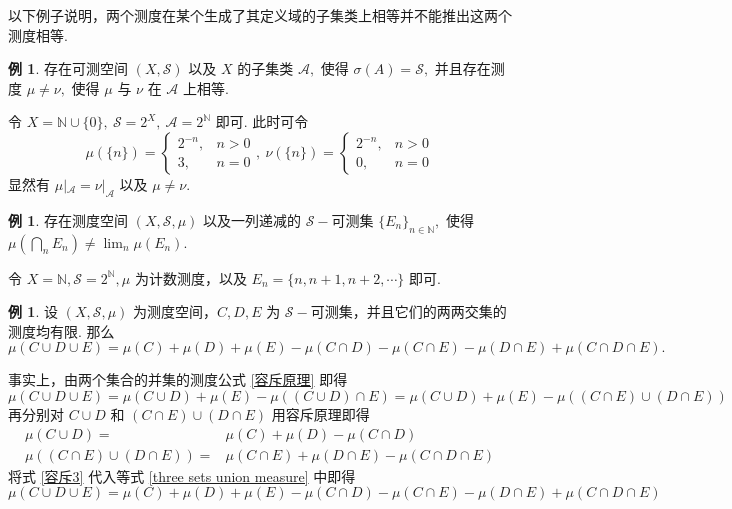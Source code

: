 \documentclass[12pt, a4paper, oneside]{book}
\numberwithin{figure}{section}
\theoremstyle{definition}
\newtheorem{example}[theorem]{例}
\begin{document}
以下例子说明，两个测度在某个生成了其定义域的子集类上相等并不能推出这两个测度相等.
\begin{example}
    存在可测空间 $(X,\mathcal S)$ 以及 $X$ 的子集类 $\mathcal A,$ 使得 $\sigma(A)=\mathcal S,$ 并且存在测度 $\mu\neq \nu,$ 使得 $\mu$ 与 $\nu$ 在 $\mathcal A$ 上相等.
\end{example}
令 $X=\mathbb N\cup\{0\},\ \mathcal S=2^X,\ \mathcal A=2^{\mathbb N}$ 即可. 此时可令 
\begin{equation}
    \mu(\{n\}) = \begin{cases}
        2^{-n},&n>0\\
        3,&n= 0
    \end{cases},\ \nu(\{n\}) = \begin{cases}
        2^{-n},&n>0\\
        0,&n= 0
    \end{cases}
\end{equation}
显然有 $\mu|_{\mathcal A}=\nu|_{\mathcal A}$ 以及 $\mu\neq\nu.$

\begin{example}
    存在测度空间 $(X,\mathcal S,\mu)$ 以及一列递减的 $\mathcal S-$可测集 $\{E_n\}_{n\in\mathbb N},$ 使得 $\mu(\bigcap_n E_n)\neq\lim_n \mu(E_n).$
\end{example}
令 $X=\mathbb N,\mathcal S=2^{\mathbb N},\mu$ 为计数测度，以及 $E_n=\{n,n+1,n+2,\cdots\}$ 即可. 

\begin{example}
    设 $(X,\mathcal S,\mu)$ 为测度空间，$C,D,E$ 为 $\mathcal S-$可测集，并且它们的两两交集的测度均有限. 那么 
    $\mu(C\cup D\cup E)=\mu(C)+\mu(D)+\mu(E)-\mu(C\cap D)-\mu(C\cap E)-\mu(D\cap E)+\mu(C\cap D\cap E).$
\end{example}

事实上，由两个集合的并集的测度公式 \eqref{容斥原理} 即得
\begin{equation}\label{three sets union measure}
    \mu(C\cup D\cup E)=\mu(C\cup D)+\mu(E)-\mu((C\cup D)\cap E)=\mu(C\cup D)+\mu(E)-\mu((C\cap E)\cup (D\cap E))
\end{equation}
再分别对 $C\cup D$ 和 $(C\cap E)\cup(D\cap E)$ 用容斥原理即得
\begin{equation}\label{容斥3}
    \begin{aligned}
        \mu(C\cup D)=&\mu(C)+\mu(D)-\mu(C\cap D)\\
        \mu((C\cap E)\cup(D\cap E))=&\mu(C\cap E)+\mu(D\cap E)-\mu(C\cap D\cap E)
    \end{aligned}
\end{equation}
将式 \eqref{容斥3} 代入等式 \eqref{three sets union measure} 中即得
\begin{equation}
    \mu(C\cup D\cup E)=\mu(C)+\mu(D)+\mu(E)-\mu(C\cap D)-\mu(C\cap E)-\mu(D\cap E)+\mu(C\cap D\cap E)
\end{equation}
\end{document}
